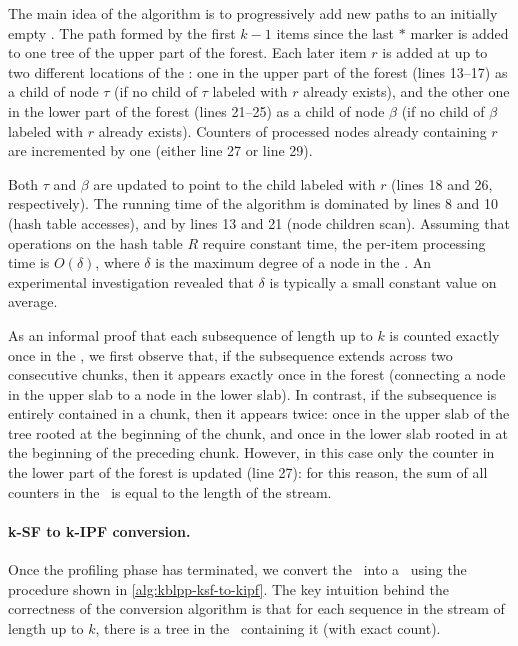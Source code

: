 \noindent
The main idea of the algorithm is to progressively add new paths to an initially empty \ksf. The path formed by the first $k-1$ items since the last $*$ marker is added to one tree of the upper part of the forest. Each later item $r$ is added at up to two different locations of the \ksf: one in the upper part of the forest (lines 13--17) as a child of node $\tau$ (if no child of $\tau$ labeled with $r$ already exists), and the other one in the lower part of the forest (lines 21--25) as a child of node $\beta$ (if no child of $\beta$ labeled with $r$ already exists). Counters of processed nodes already containing $r$ are incremented by one (either line 27 or line 29).

Both $\tau$ and $\beta$ are updated to point to the child labeled with $r$ (lines 18 and 26, respectively). The running time of the algorithm is dominated by lines 8 and 10 (hash table accesses), and by lines 13 and 21 (node children scan). Assuming that operations on the hash table $R$ require constant time, the per-item processing time is $O(\delta)$, where $\delta$ is the maximum degree of a node in the \ksf. An experimental investigation revealed that $\delta$ is typically a small constant value on average.

As an informal proof that each subsequence of length up to $k$ is counted exactly once in the \ksf, we first observe that, if the subsequence extends across two consecutive chunks, then it appears exactly once in the forest (connecting a node in the upper slab to a node in the lower slab). In contrast, if the subsequence is entirely contained in a chunk, then it appears twice: once in the upper slab of the tree rooted at the beginning of the chunk, and once in the lower slab rooted in at the beginning of the preceding chunk. However, in this case only the counter in the lower part of the forest is updated (line 27): for this reason, the sum of all counters in the \ksf\ is equal to the length of the stream.

\paragraph*{k-SF to k-IPF conversion.} Once the profiling phase has terminated, 
we convert the \ksf\ into a \kipf\ using the procedure
shown in \myalgorithm\ref{alg:kblpp-ksf-to-kipf}.
The key intuition behind the correctness of the conversion algorithm is that for each sequence in the stream of length up to $k$, there is a tree in the \ksf\ containing it (with exact count).

